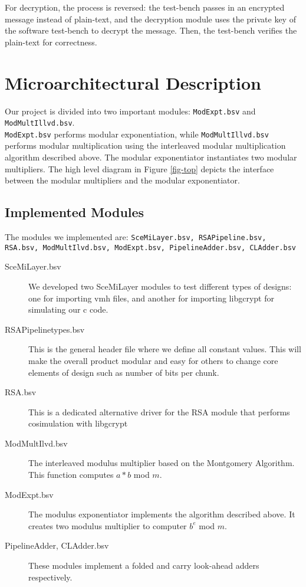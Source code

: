 \documentclass[a4paper,11pt]{report}
\begin{document}
For decryption, the process is reversed: the test-bench passes in an 
encrypted message instead of plain-text, and the decryption module uses
the private key of the software test-bench to decrypt the message. Then, the test-bench
verifies the plain-text for correctness.


\chapter*{Microarchitectural Description} 

Our project is divided into two important modules: {\tt ModExpt.bsv} and {\tt ModMultIllvd.bsv}.
\\
{\tt ModExpt.bsv} performs modular exponentiation,
while {\tt ModMultIllvd.bsv} performs modular multiplication using the interleaved modular multiplication algorithm described above.
The modular exponentiator instantiates two modular multipliers.
The high level diagram in Figure \ref{fig-top} depicts the interface between
the modular multipliers and the modular exponentiator.

\section{Implemented Modules}
The modules we implemented are:  {\tt SceMiLayer.bsv, RSAPipeline.bsv, RSA.bsv, ModMultIlvd.bsv, ModExpt.bsv, PipelineAdder.bsv, CLAdder.bsv}

\begin{description}
  \item[SceMiLayer.bsv] We developed two SceMiLayer modules to test different types of designs: one for importing vmh files, and another for importing libgcrypt for simulating our c code.  

  \item[RSAPipelinetypes.bsv] This is the general header file where we define all constant values.  This will make the overall product modular and easy for others to change core elements of design such as number of bits per chunk.
  \item[RSA.bsv]This is a dedicated alternative driver for the RSA module that performs cosimulation with libgcrypt
  \item[ModMultIlvd.bsv] The interleaved modulus multiplier based on the Montgomery Algorithm.  This function computes $a*b$ mod $m$.
  \item[ModExpt.bsv] The modulus exponentiator implements the algorithm described above.  It creates two modulus multiplier to computer $b^e$ mod $m$.
  \item[PipelineAdder, CLAdder.bsv] These modules implement a folded and carry look-ahead adders respectively. 
\end{description}
\end{document}
